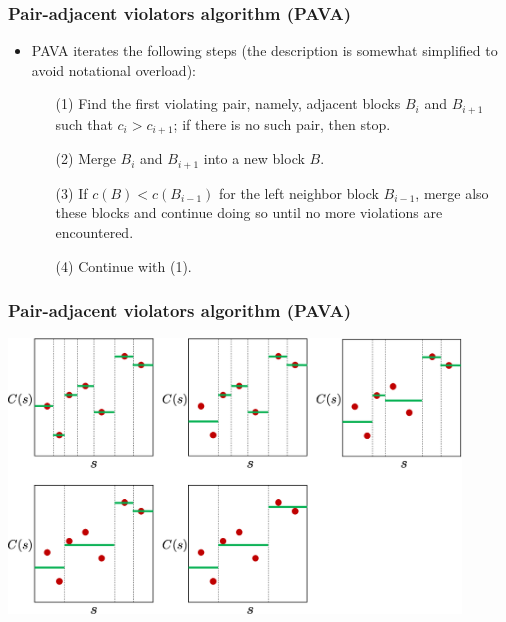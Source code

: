 \documentclass[11pt,compress,t,notes=noshow, xcolor=table]{beamer}
\begin{document}
\begin{frame}[t]
	\frametitle{Pair-adjacent violators algorithm (PAVA)}
	
	\begin{itemize}
		\item PAVA iterates the following steps (the description is somewhat simplified to avoid notational overload):
		
		\medskip
		
		\begin{itemize}
			\item[(1)] Find the first violating pair, namely, adjacent blocks $B_i$ and $B_{i+1}$ such that $c_i > c_{i+1}$; if there is no such pair, then stop.
			\item[(2)] Merge $B_i$ and $B_{i+1}$ into a new block $B$.
			\item[(3)] If $c(B) < c(B_{i-1})$ for the left neighbor block $B_{i-1}$, merge also these blocks and continue doing so until no more violations are encountered.
			\item[(4)] Continue with (1).
		\end{itemize}
	\end{itemize}
\end{frame}



\begin{frame}[t]
	\frametitle{Pair-adjacent violators algorithm (PAVA)}
	
	\medskip 
	
	\begin{center}
		\includegraphics[width=0.9\textwidth]{figure/pic-pava}
		
	\end{center}
\end{frame}
\end{document}
